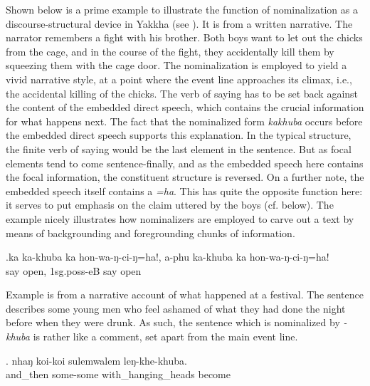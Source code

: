 Shown below is a prime example to illustrate the function of  nominalization as a discourse-structural device in Yakkha (see \Next). It  is from a written narrative. The narrator remembers a fight with his brother. Both boys want to let out the chicks from the cage, and in the course of the fight, they accidentally kill them by squeezing them with the cage door.  The nominalization is employed to yield a vivid narrative style, at a point where the event line approaches its climax, i.e., the accidental killing of the chicks. The verb of saying has to be set back against the content of the embedded direct speech, which contains the crucial information for what happens next. The fact that the nominalized form \emph{kakhuba}  occurs before the embedded direct speech supports this explanation. In the typical structure, the finite verb of saying would be the last element in the sentence. But as focal elements tend to come sentence-finally, and as the embedded speech here contains the focal information, the constituent structure is reversed.  On a further note, the embedded speech itself contains a   \emph{=ha}. This  has quite the opposite function here: it serves to put emphasis on the claim uttered by the boys (cf.  below).  The example nicely illustrates how nominalizers are employed to carve out a text by means of backgrounding and foregrounding chunks of information.
	
	
	\exg.ka  ka-khuba ka  hon-wa-ŋ-ci-ŋ=ha!, a-phu ka-khuba ka   hon-wa-ŋ-ci-ŋ=ha!\\
	  say  open, {\sc 1sg.poss-}eB  say  open\\
	 
	
	
Example \Next is from a narrative account of what happened at a festival. The sentence describes some young men who feel ashamed of what they had done the night before when they were drunk. As such, the sentence which is nominalized by  \emph{-khuba} is rather like a comment, set apart from the main event line. 

	\exg. nhaŋ  koi-koi sulemwalem leŋ-khe-khuba.\\
	and\_then some-some with\_hanging\_heads become\\
	 


